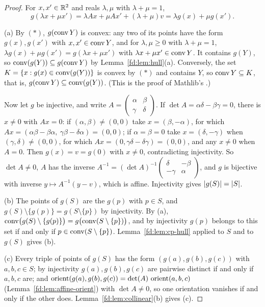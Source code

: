 \begin{proof}
For $x,x'\in\mathbb R^2$ and reals $\lambda,\mu$ with $\lambda+\mu=1$,
\begin{equation*}
  g(\lambda x+\mu x')=\lambda Ax+\mu Ax'+(\lambda+\mu)v=\lambda g(x)+\mu g(x'). \tag{$*$}
\end{equation*}

(a) By $(*)$, $g(\operatorname{conv} Y)$ is convex: any two of its points have the form $g(x),g(x')$ with
$x,x'\in\operatorname{conv} Y$, and for
$\lambda,\mu\ge0$ with $\lambda+\mu=1$, $\lambda g(x)+\mu g(x')=g(\lambda x+\mu x')$ with
$\lambda x+\mu x'\in\operatorname{conv} Y$. It contains $g(Y)$, so $\operatorname{conv}(g(Y))\subseteq g(\operatorname{conv} Y)$ by
Lemma~\ref{fd:lem:hull}(a). Conversely, the set $K=\{x:g(x)\in\operatorname{conv}(g(Y))\}$ is convex by $(*)$ and
contains $Y$, so $\operatorname{conv} Y\subseteq K$, that is, $g(\operatorname{conv} Y)\subseteq\operatorname{conv}(g(Y))$. (This is the proof of
Mathlib's .)

Now let $g$ be injective, and write $A=\begin{pmatrix}\alpha&\beta\\ \gamma&\delta\end{pmatrix}$. If
$\det A=\alpha\delta-\beta\gamma=0$, there is $x\ne0$ with $Ax=0$: if $(\alpha,\beta)\ne(0,0)$ take
$x=(\beta,-\alpha)$, for which $Ax=(\alpha\beta-\beta\alpha,\ \gamma\beta-\delta\alpha)=(0,0)$; if
$\alpha=\beta=0$ take $x=(\delta,-\gamma)$ when $(\gamma,\delta)\ne(0,0)$, for which
$Ax=(0,\gamma\delta-\delta\gamma)=(0,0)$, and any $x\ne0$ when $A=0$. Then $g(x)=v=g(0)$ with $x\ne0$,
contradicting injectivity. So $\det A\ne0$, $A$ has the inverse
$A^{-1}=(\det A)^{-1}\begin{pmatrix}\delta&-\beta\\ -\gamma&\alpha\end{pmatrix}$, and $g$ is bijective with
inverse $y\mapsto A^{-1}(y-v)$, which is affine. Injectivity gives $\lvert g(S)\rvert=\lvert S\rvert$.

(b) The points of $g(S)$ are the $g(p)$ with $p\in S$, and $g(S)\setminus\{g(p)\}=g(S\setminus\{p\})$ by
injectivity. By (a), $\operatorname{conv}\bigl(g(S)\setminus\{g(p)\}\bigr)=g\bigl(\operatorname{conv}(S\setminus\{p\})\bigr)$, and by
injectivity $g(p)$ belongs to this set if and only if $p\in\operatorname{conv}(S\setminus\{p\})$. Lemma~\ref{fd:lem:cp-hull}
applied to $S$ and to $g(S)$ gives (b).

(c) Every triple of points of $g(S)$ has the form $(g(a),g(b),g(c))$ with $a,b,c\in S$; by injectivity
$g(a),g(b),g(c)$ are pairwise distinct if and only if $a,b,c$ are; and
$\operatorname{orient}(g(a),g(b),g(c))=\det(A)\,\operatorname{orient}(a,b,c)$ (Lemma~\ref{fd:lem:affine-orient}) with $\det A\ne0$, so
one orientation vanishes if and only if the other does. Lemma~\ref{fd:lem:collinear}(b) gives (c).


\end{proof}
